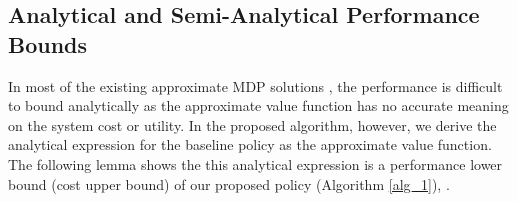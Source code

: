 \subsection{Analytical and Semi-Analytical Performance Bounds}
\label{subsec:analysis}
In most of the existing approximate MDP solutions \cite{mdp-bound1,mdp-bound2,mdp-bound3}, the performance is difficult to bound analytically as the approximate value function has no accurate meaning on the system cost or utility.
In the proposed algorithm, however, we derive the analytical expression for the baseline policy as the approximate value function.
The following lemma shows the this analytical expression is a performance lower bound (cost upper bound) of our proposed policy (Algorithm \ref{alg_1}), .
